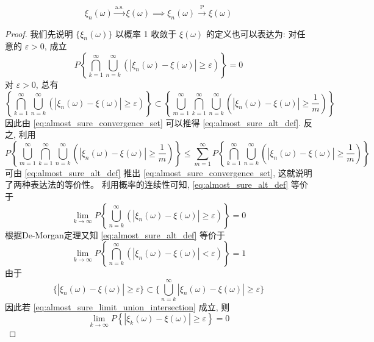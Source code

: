 \begin{theorem}\label{thm:以概率1收敛推出依概率收敛}
    \[ \xi_n(\omega) \xrightarrow{\text{a.s.}} \xi(\omega) \implies \xi_n(\omega) \xrightarrow{\text{P}} \xi(\omega) \]
\end{theorem}
\begin{proof}
我们先说明 $\{\xi_n(\omega)\}$ 以概率 1 收敛于 $\xi(\omega)$ 的定义也可以表达为: 对任意的 $\varepsilon>0$, 成立
\begin{equation} \label{eq:almost_sure_alt_def}
P\left\{ \bigcap_{k=1}^\infty \bigcup_{n=k}^\infty (|\xi_n(\omega)-\xi(\omega)|\ge\varepsilon) \right\}=0
\end{equation}
对 $\varepsilon>0$, 总有
$$ \left\{ \bigcap_{k=1}^\infty \bigcup_{n=k}^\infty (|\xi_n(\omega)-\xi(\omega)|\ge\varepsilon) \right\}  \subset \left\{ \bigcup_{m=1}^\infty \bigcap_{k=1}^\infty \bigcup_{n=k}^\infty \left(|\xi_n(\omega)-\xi(\omega)|\ge\frac{1}{m}\right) \right\} $$
因此由 \eqref{eq:almost_sure_convergence_set} 可以推得 \eqref{eq:almost_sure_alt_def}. 反之, 利用
$$ P\left\{ \bigcup_{m=1}^{\infty}\bigcap_{k=1}^\infty \bigcup_{n=k}^\infty \left(|\xi_n(\omega)-\xi(\omega)|\ge\frac{1}{m}\right) \right\}  \le \sum_{m=1}^\infty P\left\{ \bigcap_{k=1}^{\infty}\bigcup_{n=k}^\infty \left(|\xi_n(\omega)-\xi(\omega)|\ge\frac{1}{m}\right) \right\} $$
可由 \eqref{eq:almost_sure_alt_def} 推出 \eqref{eq:almost_sure_convergence_set}, 这就说明了两种表达法的等价性。
利用概率的连续性可知, \eqref{eq:almost_sure_alt_def} 等价于
\begin{equation} \label{eq:almost_sure_limit_union_intersection}
\lim_{k\to\infty} P\left\{ \bigcup_{n=k}^\infty (|\xi_n(\omega)-\xi(\omega)|\ge\varepsilon) \right\}=0
\end{equation}
根据De-Morgan定理又知 \eqref{eq:almost_sure_alt_def} 等价于
\begin{equation} \label{eq:almost_sure_limit_intersection_union}
\lim_{k\to\infty} P\left\{ \bigcap_{n=k}^\infty (|\xi_n(\omega)-\xi(\omega)|<\varepsilon) \right\}=1
\end{equation}
由于
$$ \{|\xi_n(\omega)-\xi(\omega)|\ge\varepsilon\} \subset  \{\bigcup_{n=k}^\infty|\xi_n(\omega)-\xi(\omega)|\ge\varepsilon\} $$
因此若 \eqref{eq:almost_sure_limit_union_intersection} 成立, 则
\begin{equation} \label{eq:limit_prob_single_term}
\lim_{k\to\infty} P\left\{ |\xi_k(\omega)-\xi(\omega)| \ge \varepsilon \right\} = 0
\end{equation}
\end{proof}

